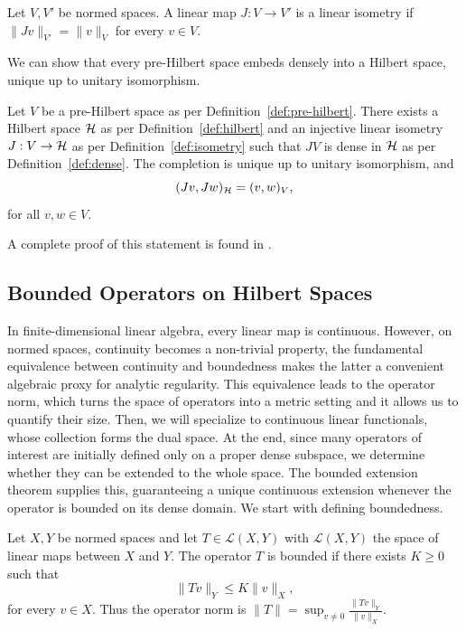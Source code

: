 \begin{definition}\label{def:isometry}
	Let $V,V'$ be normed spaces. A linear map $J: V\to V'$ is a linear isometry if $\|Jv\|_{V'}=\|v\|_V$ for every $v\in V$.
\end{definition}

\noindent We can show that every pre-Hilbert space embeds densely into a Hilbert space, unique up to unitary isomorphism.

\begin{theorem}\label{thm:completion}
	Let $V$ be a pre-Hilbert space as per Definition~\ref{def:pre-hilbert}. There exists a Hilbert space $\H$ as per Definition~\ref{def:hilbert} and an injective linear isometry $J: V\to\H$ as per Definition~\ref{def:isometry} such that $JV$ is dense in $\H$ as per Definition~\ref{def:dense}. The completion is unique up to unitary isomorphism, and
	\begin{equation}
		( Jv,Jw)_{\H}=( v,w)_V,
	\end{equation}
	for all $v,w\in V$.
\end{theorem}

\noindent A complete proof of this statement is found in \cite[Theorem 3.11]{morettiSpectralTheoryQuantum}.

\subsection*{Bounded Operators on Hilbert Spaces}

In finite-dimensional linear algebra, every linear map is continuous. However, on normed spaces, continuity becomes a non-trivial property, the fundamental equivalence between continuity and boundedness makes the latter a convenient algebraic proxy for analytic regularity. This equivalence leads to the operator norm, which turns the space of operators into a metric setting and it allows us to quantify their size. Then, we will specialize to continuous linear functionals, whose collection forms the dual space. At the end, since many operators of interest are initially defined only on a proper dense subspace, we determine whether they can be extended to the whole space. The bounded extension theorem supplies this, guaranteeing a unique continuous extension whenever the operator is bounded on its dense domain. We start with defining boundedness.

\begin{definition}\label{def:op-norm-bdd}
	Let $X,Y$ be normed spaces and let $T\in\mathcal{L}(X,Y)$ with $\mathcal{L}(X,Y)$ the space of linear maps between $X$ and $Y$. The operator $T$ is bounded if there exists $K\geq 0$ such that
	\begin{equation}
		\|Tv\|_Y\leq K\|v\|_X,
	\end{equation}
	for every $v\in X$. Thus the operator norm is $\|T\|=\sup_{v\neq 0} \frac{\|Tv\|_Y}{\|v\|_X}$. 
\end{definition}


